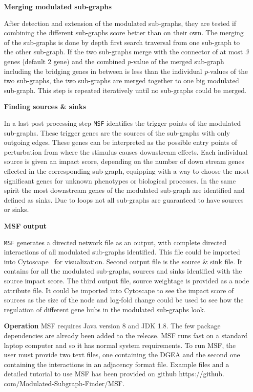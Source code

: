 \documentclass[10pt,a4paper,twocolumn]{article}
\begin{document}
	\textbf{Merging modulated sub-graphs}
	
	After detection and extension of the modulated sub-graphs, they are tested
	if combining the different sub-graphs score better than on their own. The merging of the sub-graphs is done by depth first search traversal from one sub-graph to the other sub-graph. If the two sub-graphs merge
	with the connector of at most \emph{3} genes (default 2 gene) and the
	combined \textit{p}-value of the merged sub-graph including the bridging
	genes in between is less than the individual \textit{p}-values of the two
	sub-graphs, the two sub-graphs are merged together to one big modulated
	sub-graph. This step is repeated iteratively until no sub-graphs could be
	merged.\newline
	
	\textbf{Finding sources \& sinks}
	
	In a last post processing step \texttt{MSF} identifies the trigger points
	of the modulated sub-graphs. These trigger genes are the sources of the
	sub-graphs with only outgoing edges. These genes can be interpreted as the
	possible entry points of perturbation from where the stimulus causes
	downstream effects. Each individual source is given an impact score, depending on the number of down stream genes effected in the corresponding sub-graph, equipping with a way to choose the most significant genes for unknown phenotypes or biological processes. In the same spirit the most downstream genes of the
	modulated sub-graph are identified and defined as sinks. Due to loops not all
	sub-graphs are guaranteed to have sources or sinks.
	
	
	\textbf{MSF output}
	
	\texttt{MSF} generates a directed network file as an output, with complete directed interactions of all modulated sub-graphs identified. This file could be imported into Cytoscape~\cite{Cyto} for visualization. Second output file is the source \& sink file. It contains for all the modulated sub-graphs, sources and sinks identified with the source impact score. The third output file, source weightage is provided as a node attribute file. It could be imported into Cytoscape to see the impact score of sources as the size of the node and log-fold change could be used to see how the regulation of different gene hubs in the modulated sub-graphs look.
	
	\textbf{Operation}
	MSF requires Java version 8 and JDK 1.8. The few package dependencies are already been added to the release. MSF runs fast on a standard laptop computer and so it has normal system requirements. To run MSF, the user must provide two text files, one containing the DGEA and the second one containing the interactions in an adjacency format file. Example files and a detailed tutorial to use MSF has been provided on github https://github. com/Modulated-Subgraph-Finder/MSF.
	
\end{document}
